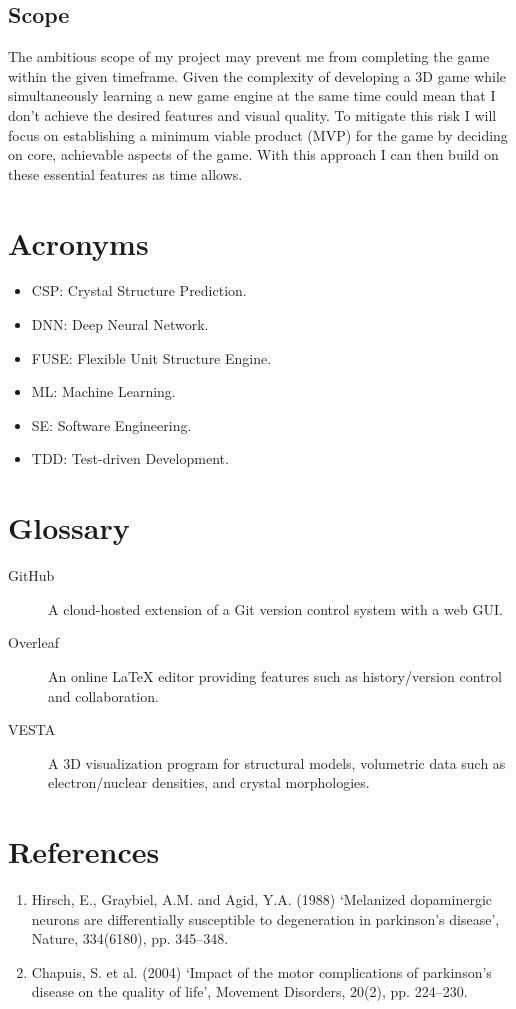 \documentclass[12pt]{article}
\begin{document}
\subsection{Scope}
The ambitious scope of my project may prevent me from completing the game within the given timeframe. Given the complexity of developing a 3D game while simultaneously learning a new game engine at the same time could mean that I don’t achieve the desired features and visual quality. To mitigate this risk I will focus on establishing a minimum viable product (MVP) for the game by deciding on core, achievable aspects of the game. With this approach I can then build on these essential features as time allows.



\section*{Acronyms}
\begin{itemize}
    \item CSP: Crystal Structure Prediction.
    \item DNN: Deep Neural Network.
    \item FUSE: Flexible Unit Structure Engine.
    \item ML: Machine Learning.
    \item SE: Software Engineering.
    \item TDD: Test-driven Development.
\end{itemize}

\section*{Glossary}
\begin{description}
    \item[GitHub] A cloud-hosted extension of a Git version control system with a web GUI.
    \item[Overleaf] An online LaTeX editor providing features such as history/version control and collaboration.
    \item[VESTA] A 3D visualization program for structural models, volumetric data such as electron/nuclear densities, and crystal morphologies.
\end{description}

\section*{References}
\begin{enumerate}
	\item Hirsch, E., Graybiel, A.M. and Agid, Y.A. (1988) ‘Melanized dopaminergic neurons are differentially susceptible to degeneration in parkinson’s disease’, Nature, 334(6180), pp. 345–348.

	\item Chapuis, S. et al. (2004) ‘Impact of the motor complications of parkinson’s disease on the quality of life’, Movement Disorders, 20(2), pp. 224–230.


\end{enumerate}
\end{document}
